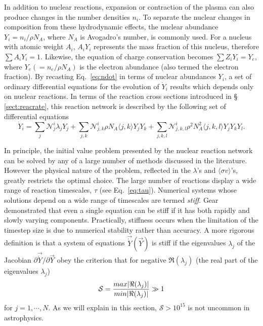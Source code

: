 \documentclass[12pt,modern,tighten,times,apj]{aastex61}
\newcommand{\sigv}{{\ensuremath{\langle \sigma v \rangle}}}
\newcommand{\calN}{\ensuremath {\mathcal N}}
\newcommand{\ye}{\ensuremath{Y_{e}}}
\begin{document}
In addition to nuclear reactions, expansion or contraction of the plasma 
can also produce changes in the number densities $n_i$.  To separate the 
nuclear changes in composition from these hydrodynamic effects, the nuclear abundance $Y_i =n_i/\rho N_A$, where $N_{A}$ is Avogadro's number, is commonly used.  For a nucleus with atomic weight $A_i$, $A_iY_i$ 
represents the mass fraction of this nucleus, therefore $\sum A_iY_i=1$.  
Likewise, the equation of charge conservation becomes $\sum Z_i Y_i = Y_e$, 
where $\ye (= n_e /\rho N_A)$ is the electron abundance (also termed the electron fraction).  By recasting Eq.~\ref{eq:ndot} in terms of nuclear abundances $Y_i$, a set of ordinary differential equations 
for the evolution of $\dot Y_i$ results which depends only on nuclear 
reactions.  In terms of the reaction cross sections introduced in \S 
\ref{sect:reacrate}, this reaction network is described by the following 
set of differential equations
\begin{equation}
    \dot Y_i = \sum_j \calN^i _j \lambda_j Y_j + \sum_{j,k} \calN^i _{j,k} 
\rho N_A \langle j,k \rangle Y_j Y_k  + \sum_{j,k,l} \calN^i _{j,k,l} \rho^2 N_A^2 \langle j,k,l \rangle Y_j Y_k Y_l. \label{eq:ydot}
\end{equation}

In principle, the initial value problem presented by the nuclear reaction network 
can be solved by any of a large number of methods discussed in the 
literature.  However the physical nature of the problem, reflected in the 
$\lambda$'s and \sigv 's, greatly restricts the optimal choice.  The large 
number of reactions display a wide range of reaction timescales, $\tau$ 
(see Eq.~\ref{eq:tau}).  Numerical systems whose solutions depend on a wide range of timescales are termed \emph{stiff}.  Gear \cite{Gear71} demonstrated that 
even a single equation can be stiff if it has both rapidly and slowly varying 
components.  Practically, stiffness occurs when the limitation of the 
timestep size is due to numerical stability rather than accuracy.  A more 
rigorous definition \cite{Lamb80} is that a system of equations $\vec{\dot Y}
(\vec Y)$ is stiff if the eigenvalues $\lambda_{j}$ of the Jacobian 
$\partial \vec{\dot Y} / \partial \vec Y$ obey the criterion that for negative $\Re(\lambda_{j})$ (the real part of the eigenvalues $\lambda_j$)
\begin{equation}
    {\mathcal S}  =  {{max |\Re(\lambda_{j})|} \over {min |\Re(\lambda_{j})|}} 
    \gg 1 
    \label{eq:lambdastiff}
\end{equation}
for $j=1,\cdots,N$.  As we will explain in this section, $\mathcal S > 10^{15}$ is not uncommon in astrophysics.
\end{document}
